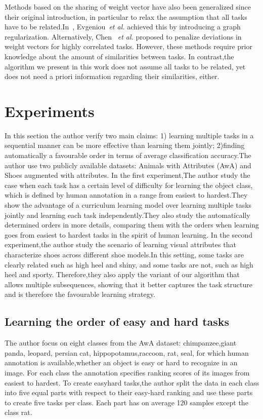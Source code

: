 \documentclass[10pt,twocolumn,letterpaper]{article}
\begin{document}
Methods based on the sharing of weight vector have also been generalized since their original introduction, in particular to relax the assumption that all tasks have to be related.In~\cite{evgeniou2005learning}, Evgeniou~\emph{et al.} achieved this by introducing a graph regularization. Alternatively, Chen ~\emph{et al.} proposed to penalize deviations in weight vectors for highly correlated tasks. However, these methods require prior knowledge about the amount of similarities between tasks. In contrast,the algorithm we present in this work does not assume all tasks to be related, yet does not need a priori information regarding their similarities, either.
\section{Experiments}
In this section the author verify two main claims: 1) learning multiple tasks in a sequential manner can be more effective than learning them jointly; 2)finding automatically a favourable order in terms of average classification accuracy.The author use two publicly available datasets: Animals with Attributes (AwA) and Shoes augmented with attributes\cite{Kovashka2015WhittleSearch}. In the first experiment,The author study the case when each task has a certain level of difficulty for learning the object class, which is defined by human annotation in a range from easiest to hardest.They show the advantage of a curriculum learning model over learning multiple tasks jointly and learning each task independently.They also study the automatically determined orders in more details, comparing them with the orders when learning goes from easiest to hardest tasks in the spirit of human learning. In the second experiment,the author study the scenario of learning visual attributes that characterize shoes across different shoe models.In this setting, some tasks are clearly related such as high heel and shiny, and some tasks are not, such as high heel and sporty. Therefore,they also apply the variant of our algorithm that allows multiple subsequences, showing that it better captures the task structure and is therefore the favourable learning strategy.
\subsection{Learning the order of easy and hard tasks}
The author focus on eight classes from the AwA dataset: chimpanzee,giant panda, leopard, persian cat, hippopotamus,raccoon, rat, seal, for which human annotation is available,whether an object is easy or hard to recognize in an image. For each class the annotation specifies ranking scores of its images from easiest to hardest. To create easyhard tasks,the author split the data in each class into five equal parts with respect to their easy-hard ranking and use these parts to create five tasks per class. Each part has on average 120 samples except the class rat.
\end{document}
